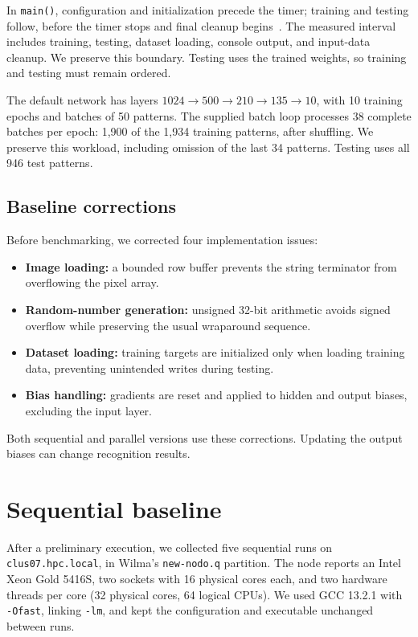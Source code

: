\documentclass[10pt,a4paper,twocolumn]{article}
\begin{document}
In \texttt{main()}, configuration and initialization precede the timer;
training and testing follow, before the timer stops and final cleanup
begins~\cite{starter-code}. The measured interval includes training,
testing, dataset loading, console output, and input-data cleanup. We
preserve this boundary. Testing uses the trained weights, so training and
testing must remain ordered.

The default network has layers $1024\to500\to210\to135\to10$, with
10 training epochs and batches of 50 patterns. The supplied batch loop
processes 38 complete batches per epoch: 1,900 of the 1,934 training patterns,
after shuffling. We preserve this workload, including omission of the last
34 patterns. Testing uses all 946 test patterns.

\subsection{Baseline corrections}

Before benchmarking, we corrected four implementation issues:
\begin{itemize}
  \item \textbf{Image loading:} a bounded row buffer prevents the string
    terminator from overflowing the pixel array.
  \item \textbf{Random-number generation:} unsigned 32-bit arithmetic avoids
    signed overflow while preserving the usual wraparound sequence.
  \item \textbf{Dataset loading:} training targets are initialized only when
    loading training data, preventing unintended writes during testing.
  \item \textbf{Bias handling:} gradients are reset and applied to hidden
    and output biases, excluding the input layer.
\end{itemize}
Both sequential and parallel versions use these corrections. Updating the
output biases can change recognition results.

\section{Sequential baseline}

After a preliminary execution, we collected five sequential runs on
\texttt{clus07.hpc.local}, in Wilma's \texttt{new-nodo.q} partition.
The node reports an Intel Xeon Gold 5416S, two sockets with 16 physical cores
each, and two hardware threads per core (32 physical cores, 64 logical CPUs).
We used GCC 13.2.1 with \texttt{-Ofast}, linking \texttt{-lm}, and kept the
configuration and executable unchanged between runs.
\end{document}
